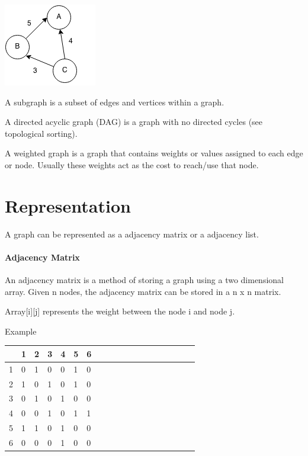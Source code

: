 \documentclass[11pt,oneside]{book}
\makeatletter
\def\maxwidth#1{\ifdim\Gin@nat@width>#1 #1\else\Gin@nat@width\fi}
\makeatother
\begin{document}
\vspace{5px}\includegraphics[width=\maxwidth{\textwidth}]{digraph.png}

A subgraph is a subset of edges and vertices within a graph.

A directed acyclic graph (DAG) is a graph with no directed cycles (see topological sorting).

A weighted graph is a graph that contains weights or values assigned to each edge or node. Usually these weights act as the cost to reach/use that node.


    \chapter{ Representation }
        

A graph can be represented as a adjacency matrix or a adjacency list.

\subsubsection{Adjacency Matrix}



An adjacency matrix is a method of storing a graph using a two dimensional array. Given n nodes, the adjacency matrix can be stored in a n x n matrix.

Array[i][j] represents the weight between the node i and node j.

Example

\vspace{10px}\begin{tabulary}{0.4\linewidth}{|l|l|l|l|l|l|l|l|l|l|l|l|l|l|l|l|l|l|l}\hline


   &
  1 &
  2 &
  3 &
  4 &
  5 &
  6\\
\hline


  1 &
  0 &
  1 &
  0 &
  0 &
  1 &
  0\\

  2 &
  1 &
  0 &
  1 &
  0 &
  1 &
  0\\

  3 &
  0 &
  1 &
  0 &
  1 &
  0 &
  0\\

  4 &
  0 &
  0 &
  1 &
  0 &
  1 &
  1\\

  5 &
  1 &
  1 &
  0 &
  1 &
  0 &
  0\\

  6 &
  0 &
  0 &
  0 &
  1 &
  0 &
  0\\

\hline\end{tabulary}
\end{document}

